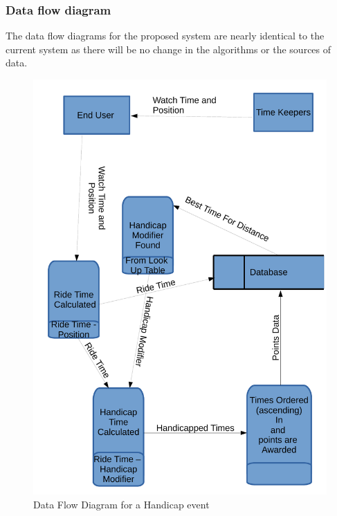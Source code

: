 \subsubsection{Data flow diagram}
The data flow diagrams for the proposed system are nearly identical to the current system as there will be no change in the algorithms or the sources of data.
\begin{figure}[H]
	\includegraphics[width=\textwidth]{./DFDPS.pdf}
	 \caption{Data Flow Diagram for a Handicap event}
\end{figure}

